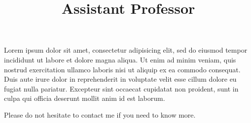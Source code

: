 \documentclass{coverletter}
\title{Assistant Professor}
\begin{document}
\begin{cl}

Lorem ipsum dolor sit amet, consectetur adipisicing elit, sed do eiusmod
tempor incididunt ut labore et dolore magna aliqua. Ut enim ad minim veniam,
quis nostrud exercitation ullamco laboris nisi ut aliquip ex ea commodo
consequat. Duis aute irure dolor in reprehenderit in voluptate velit esse
cillum dolore eu fugiat nulla pariatur. Excepteur sint occaecat cupidatat non
proident, sunt in culpa qui officia deserunt mollit anim id est laborum.

Please do not hesitate to contact me if you need to know more.

\end{cl}
\end{document}
